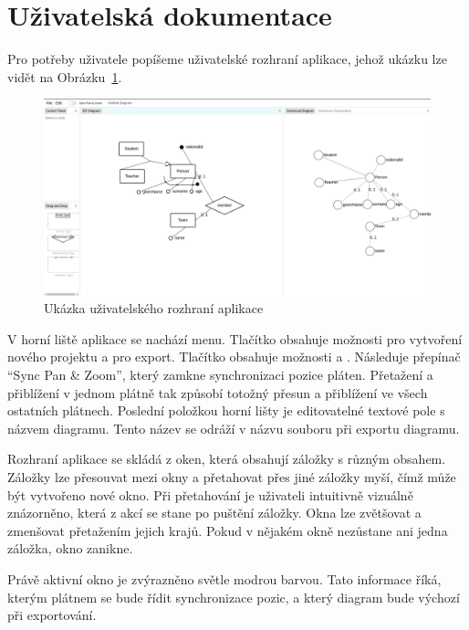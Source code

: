\section{Uživatelská dokumentace}
Pro potřeby uživatele popíšeme uživatelské rozhraní aplikace, jehož ukázku lze vidět na Obrázku~\ref{fig:user-interface}.

\begin{figure}[!htb]
  \centering
  \includegraphics[width=\maxwidth{\textwidth}]{../img/app/user-interface.png}
  \caption{Ukázka uživatelského rozhraní aplikace}
  \label{fig:user-interface}
\end{figure}

V horní liště aplikace se nachází menu.
Tlačítko  obsahuje možnosti pro vytvoření nového projektu a pro export.
Tlačítko  obsahuje možnosti  a .
Následuje přepínač \enquote{Sync Pan \& Zoom}, který zamkne synchronizaci pozice pláten.
Přetažení a přiblížení v jednom plátně tak způsobí totožný přesun a přiblížení ve všech ostatních plátnech.
Poslední položkou horní lišty je editovatelné textové pole s názvem diagramu.
Tento název se odráží v názvu souboru při exportu diagramu.

Rozhraní aplikace se skládá z oken, která obsahují záložky s různým obsahem.
Záložky lze přesouvat mezi okny a přetahovat přes jiné záložky myší, čímž může být vytvořeno nové okno.
Při přetahování je uživateli intuitivně vizuálně znázorněno, která z akcí se stane po puštění záložky.
Okna lze zvětšovat a zmenšovat přetažením jejich krajů.
Pokud v nějakém okně nezůstane ani jedna záložka, okno zanikne.

Právě aktivní okno je zvýrazněno světle modrou barvou.
Tato informace říká, kterým plátnem se bude řídit synchronizace pozic, a který diagram bude výchozí při exportování.

